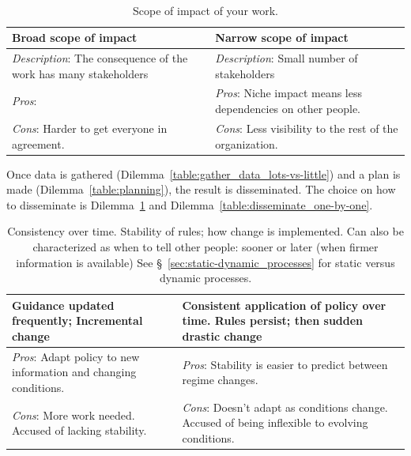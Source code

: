 \ \\

\begin{center}
\begin{table}[ht]
\begin{tabular}{ | m{\dilemmatablewidth}| m{\dilemmatablewidth} | } 
  \hline
  \textbf{Broad scope of impact} &
  \textbf{Narrow scope of impact} \\
  \hline
  \textit{Description}: The consequence of the work has many stakeholders &
  \textit{Description}: Small number of stakeholders \\  
  \hline
  \textit{Pros}:  &
  \textit{Pros}: Niche impact means less dependencies on other people. \\
  \hline
  \textit{Cons}: Harder to get everyone in agreement. & 
  \textit{Cons}: Less visibility to the rest of the organization. \\
  \hline
\end{tabular}
\caption{Scope of impact of your work. 
}
\end{table}
\label{table:scope_broad-vs-narrow}
\end{center}


Once data is gathered (Dilemma~\ref{table:gather_data_lots-vs-little}) and a plan is made (Dilemma~\ref{table:planning}), the result is disseminated. The choice on how to disseminate is Dilemma~\ref{table:consistency} and Dilemma~\ref{table:disseminate_one-by-one}.

\begin{center}
\begin{table}[ht]
\begin{tabular}{ | m{\dilemmatablewidth}| m{\dilemmatablewidth} | } 
  \hline
  \textbf{Guidance updated frequently; Incremental change} & 
  \textbf{Consistent application of policy over time. Rules persist; then sudden drastic change} \\ 
  \hline
  \textit{Pros}: Adapt policy to new information and changing conditions. &
  \textit{Pros}: Stability is easier to predict between regime changes.  \\
  \hline
  \textit{Cons}: More work needed. Accused of lacking stability. & 
  \textit{Cons}: Doesn't adapt as conditions change. Accused of being inflexible to evolving conditions. \\
  \hline
\end{tabular}
\caption{Consistency over time. Stability of rules; how change is implemented. Can also be characterized as when to tell other people: sooner or later (when firmer information is available) See \S~\ref{sec:static-dynamic_processes} for static versus dynamic processes.
}
\label{table:consistency}
\end{table}
\end{center}

